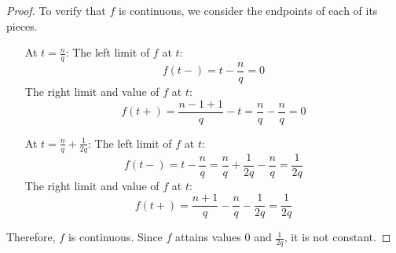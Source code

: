 \documentclass[12pt, reqno]{article}
\theoremstyle{definition}
\theoremstyle{remark}
\begin{document}
\begin{itemize}
\begin{proof}
        
    To verify that $f$ is continuous, we consider the endpoints of each of its pieces. 
    
    \begin{itemize}
        \item[At $t= \frac{n}{q}$:]
    The left limit of $f$ at $t$: 
    \[ 
        f(t-)= t- \frac{n}{q}=0
    \] 
    The right limit and value of $f$ at $t$: 
    \[ 
        f(t+)= \frac{n-1+1}{q}- t= \frac{n}{q}- \frac{n}{q}=0
    \]
    \item[At $t= \frac{n}{q}+ \frac{1}{2q}$:]
    The left limit of $f$ at $t$: 
    \[ 
        f(t-)=t- \frac{n}{q}= \frac{n}{q}+ \frac{1}{2q}- \frac{n}{q}= \frac{1}{2q}
    \]
    The right limit and value of $f$ at $t$: 
    \[ 
        f(t+)= \frac{n+1}{q}- \frac{n}{q}- \frac{1}{2q}= \frac{1}{2q}
    \]
    \end{itemize}
    Therefore, $f$ is continuous. 
    Since $f$ attains values $0$ and $\frac{1}{2q}$, it is not constant.
\end{proof}

\end{itemize}
\end{document}
